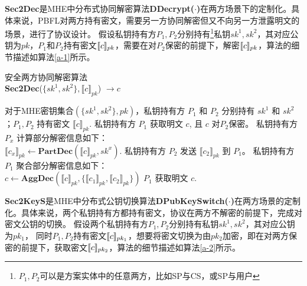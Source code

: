 \textbf{Sec2Dec}是MHE中分布式协同解密算法\textbf{DDecrypt($\cdot$)}在两方场景下的定制化。具体来说，PBFL对两方持有密文，需要另一方协同解密但又不向另一方泄露明文的场景，进行了协议设计。
假设私钥持有方$P_1,P_2$分别持有\footnote{$P_1,P_2$可以是方案实体中的任意两方，比如SP与CS，或SP与用户}私钥$sk^1, sk^2$，其对应公钥为$ pk $，$ P_1 $和$P_2$持有密文$\ctx[pk]{c}$，需要在对$P_2$保密的前提下，解密$\ctx[pk]{c}$，算法的细节描述如算法\ref{a-1}所示。
\begin{algorithm}[htbp]
	\caption{安全两方协同解密算法\\ \textbf{Sec2Dec}($\{sk^1, sk^2\}, \llbracket c\rrbracket_{pk}$) $\rightarrow c$}
	\label{a-1}
	\begin{algorithmic}[1]
		\REQUIRE 对于MHE密钥集合$(\{sk^1, sk^2\}, pk)$，私钥持有方 $P_1$ 和 $P_2$ 分别持有 $sk^1$ 和 $sk^2$；$P_1, P_2$ 持有密文 $\llbracket c\rrbracket_{pk}$.
		\ENSURE 私钥持有方 $P_1$ 获取明文 $c$, 且 $c$ 对$ P_2 $保密。
		\STATE 私钥持有方 $P_x$ 计算部分解密信息如下：\\ $\llbracket c_x\rrbracket_{pk} \leftarrow \textbf{PartDec}(\llbracket c\rrbracket_{pk}, sk^x)$. 
		\ENDFOR
		\STATE 私钥持有方 $P_2$ 发送 $\llbracket c_2\rrbracket_{pk}$ 到 $P_1$。
		\STATE 私钥持有方 $P_1$ 聚合部分解密信息如下：\\ $c \leftarrow \textbf{AggDec}(\llbracket c\rrbracket_{pk}, \{\llbracket c_1\rrbracket_{pk}, \llbracket c_2\rrbracket_{pk}\})$
		\RETURN $P_1$ 获取明文 $ c $.
	\end{algorithmic}
\end{algorithm}

\textbf{Sec2KeyS}是MHE中分布式公钥切换算法\textbf{DPubKeySwitch($ \cdot $)}在两方场景的定制化。具体来说，两个私钥持有方都持有密文，协议在两方不解密的前提下，完成对密文公钥的切换。
假设两个私钥持有方$P_1, P_2$分别持有私钥$sk^1, sk^2$，其对应公钥为$ pk_1 $，
同时$P_1, P_2$持有密文$ \ctx[pk_1]{c} $，想要将密文切换为由$ pk_2 $加密，即在对两方保密的前提下，获取密文$ \ctx[pk_2]{c} $，算法的细节描述如算法\ref{a-2}所示。

